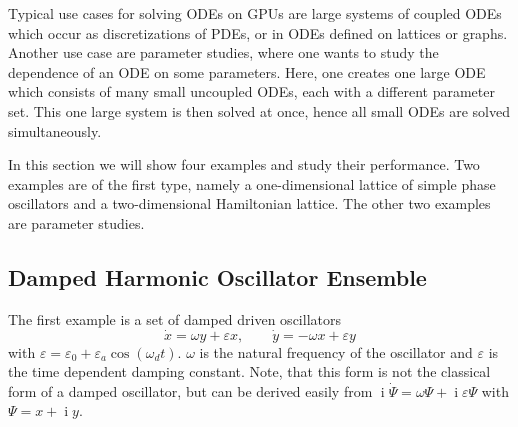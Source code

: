 \documentclass[final]{siamltex}
\newcommand {\ii} {\mathop{i}}
\begin{document}
Typical use cases for solving ODEs on GPUs are large systems of
coupled ODEs which occur as discretizations of PDEs, or in ODEs
defined on lattices or graphs. Another use case are parameter studies,
where one wants to study the dependence of an ODE on some
parameters. Here, one creates one large ODE which consists of many
small uncoupled ODEs, each with a different parameter set. This one
large system is then solved at once, hence all small ODEs are solved
simultaneously.

In this section we will show four examples and study their
performance. Two examples are of the first type, namely a
one-dimensional lattice of simple phase oscillators and a
two-dimensional Hamiltonian lattice. The other two examples are
parameter studies.






%
%
\subsection{Damped Harmonic Oscillator Ensemble}

The first example is a set of damped driven oscillators
\begin{equation} \label{eq:dampedsystem}
    \dot{x} = \omega y + \varepsilon x, \quad \quad
    \dot{y} = -\omega x + \varepsilon y
\end{equation}
with $\varepsilon = \varepsilon_0 + \varepsilon_a \cos \left( \omega_d
t \right)$. $\omega$ is the natural frequency of the oscillator and
$\varepsilon$ is the time dependent damping constant.  Note, that this form is
not the classical form of a damped oscillator, but can be derived easily from
$\ii \dot{\Psi} = \omega \Psi + \ii \varepsilon \Psi$ with $\Psi = x + \ii y$.
\end{document}
